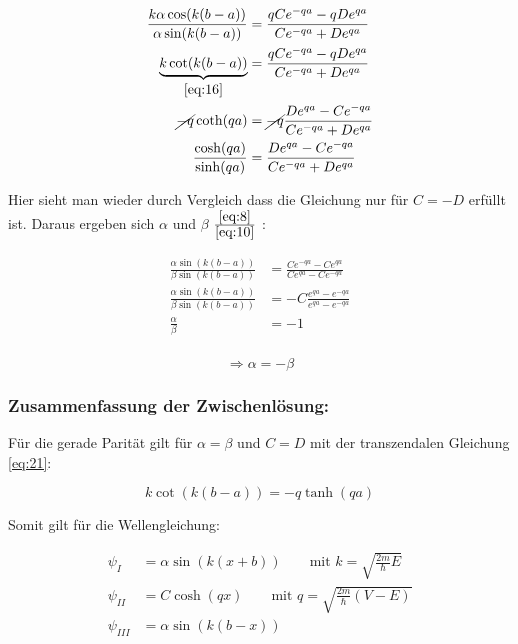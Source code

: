 \begin{align}  
  \frac{k\alpha\cos(k(b-a))}{\alpha\sin(k(b-a))} &= \frac{qCe^{-qa}-qDe^{qa}}{Ce^{-qa}+De^{qa}}\\
\underbrace{k\cot(k(b-a))}_{\eqref{eq:16}} &= \frac{qCe^{-qa}-qDe^{qa}}{Ce^{-qa}+De^{qa}}\\
\cancel{-q} \coth(qa) &=\cancel{ -q} \frac{De^{qa}-Ce^{-qa}}{Ce^{-qa}+De^{qa}}\\
\frac{\cosh(qa)}{\sinh(qa)} &= \frac{De^{qa}-Ce^{-qa}}{Ce^{-qa}+De^{qa}}\label{eq:24_1}
\end{align}

Hier sieht man wieder durch Vergleich dass die Gleichung nur für \(C=-D\) erfüllt ist. Daraus ergeben sich \(\alpha\) und \(\beta\)  \(\frac{\eqref{eq:8}}{\eqref{eq:10}}\) :

\begin{align}
  \label{eq:24_2}
\frac{\alpha\sin(k(b-a))}{\beta\sin(k(b-a))} &= \frac{Ce^{-qa}-Ce^{qa}}{Ce^{qa}-Ce^{-qa}}\\
\frac{\alpha\sin(k(b-a))}{\beta\sin(k(b-a))} &= -C\frac{e^{qa}-e^{-qa}}{e^{qa}-e^{-qa}}\\
\frac{\alpha}{\beta} &= -1\\
\end{align}

\begin{equation}
  \label{eq:24_3}
 \Rightarrow  \alpha = -\beta
\end{equation}


\subsubsection{Zusammenfassung der Zwischenlösung:}

Für die gerade Parität gilt für \(\alpha=\beta\) und \(C=D\) mit der transzendalen Gleichung \eqref{eq:21}:

\begin{equation}
  \label{eq:25}
  \boxed{k\cot(k(b-a)) = -q \tanh(qa)}
\end{equation}

Somit gilt für die Wellengleichung:

\begin{align}
  \label{eq:26}
  \psi_{I} &= \alpha \sin(k(x+b))  \qquad \text{mit } k = \sqrt{\frac{2m}{\hbar}E}\\
  \psi_{II} &= C\cosh(qx) \qquad \text{mit } q = \sqrt{\frac{2m}{\hbar}(V-E)} \\
 \psi_{III} &= \alpha \sin(k(b-x))
\end{align}

